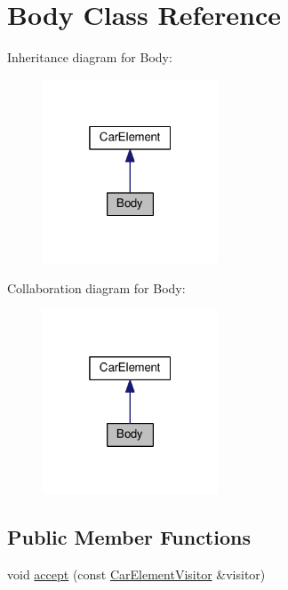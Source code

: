 \hypertarget{classBody}{}\section{Body Class Reference}
\label{classBody}


Inheritance diagram for Body\+:
\nopagebreak
\begin{figure}[H]
\begin{center}
\leavevmode
\includegraphics[width=148pt]{classBody__inherit__graph}
\end{center}
\end{figure}


Collaboration diagram for Body\+:
\nopagebreak
\begin{figure}[H]
\begin{center}
\leavevmode
\includegraphics[width=148pt]{classBody__coll__graph}
\end{center}
\end{figure}
\subsection*{Public Member Functions}
\begin{DoxyCompactItemize}
\item 
void \hyperlink{classBody_a1a00b0272b72001a9c40303b719de342}{accept} (const \hyperlink{structCarElementVisitor}{Car\+Element\+Visitor} \&visitor)
\end{DoxyCompactItemize}


